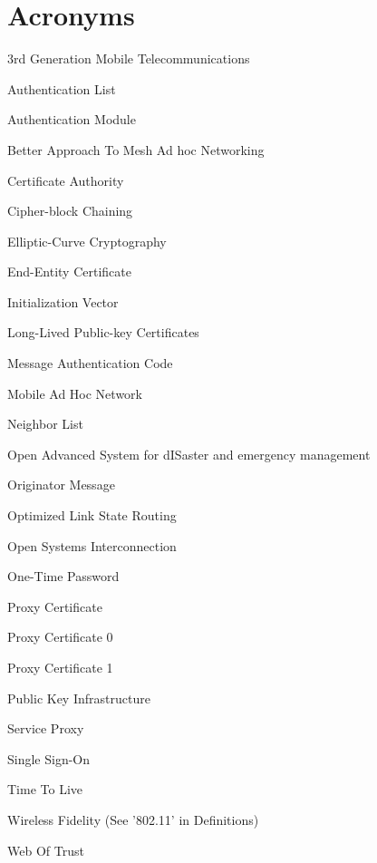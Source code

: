 \chapter*{Acronyms}

\begin{acronym}

 {3rd Generation Mobile Telecommunications}


 {Authentication List}

 {Authentication Module}

 {Better Approach To Mesh Ad hoc Networking}

 {Certificate Authority}

 {Cipher-block Chaining}





 {Elliptic-Curve Cryptography}

 {End-Entity Certificate}

 {Initialization Vector}

 {Long-Lived Public-key Certificates}

 {Message Authentication Code}

 {Mobile Ad Hoc Network}


 {Neighbor List}

 {Open Advanced System for dISaster and emergency management}

 {Originator Message}

 {Optimized Link State Routing}

 {Open Systems Interconnection}

 {One-Time Password}

 {Proxy Certificate}

 {Proxy Certificate 0}

 {Proxy Certificate 1}


 {Public Key Infrastructure}



 {Service Proxy}

 {Single Sign-On}

 {Time To Live}


 {Wireless Fidelity (See '802.11' in Definitions)}

 {Web Of Trust}

\end{acronym}
